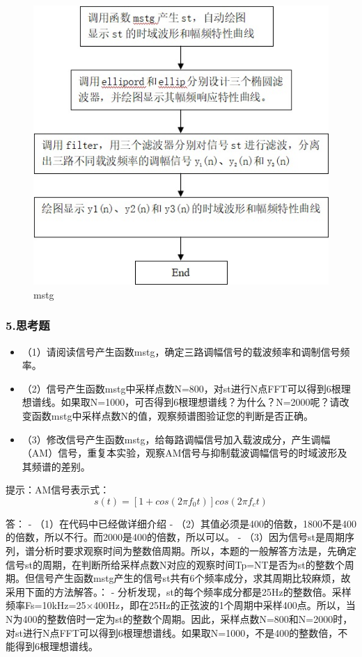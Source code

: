 \documentclass[11pt]{article}
\makeatletter
\def\maxwidth{\ifdim\Gin@nat@width>\linewidth\linewidth
    \else\Gin@nat@width\fi}
\let\Oldincludegraphics\includegraphics
\renewcommand{\includegraphics}[1]{\Oldincludegraphics[width=.8\maxwidth]{#1}}
\providecommand{\tightlist}{%
      \setlength{\itemsep}{0pt}\setlength{\parskip}{0pt}}
\makeatother
\begin{document}
\begin{figure}
\centering
\includegraphics{mstg.jpg}
\caption{mstg}
\end{figure}

    \subsubsection{5.思考题}\label{ux601dux8003ux9898}

\begin{itemize}
\tightlist
\item
  （1）请阅读信号产生函数mstg，确定三路调幅信号的载波频率和调制信号频率。
\item
  （2）信号产生函数mstg中采样点数N=800，对st进行N点FFT可以得到6根理想谱线。如果取N=1000，可否得到6根理想谱线？为什么？N=2000呢？请改变函数mstg中采样点数N的值，观察频谱图验证您的判断是否正确。
\item
  （3）修改信号产生函数mstg，给每路调幅信号加入载波成分，产生调幅（AM）信号，重复本实验，观察AM信号与抑制载波调幅信号的时域波形及其频谱的差别。
\end{itemize}

提示：AM信号表示式：\[s(t)=[1+cos(2\pi f_0 t)]cos(2\pi f_c t)\]

答： - （1）在代码中已经做详细介绍 -
（2）其值必须是400的倍数，1800不是400的倍数，所以不行。而2000是400的倍数，所以可以。
-
（3）因为信号st是周期序列，谱分析时要求观察时间为整数倍周期。所以，本题的一般解答方法是，先确定信号st的周期，在判断所给采样点数N对应的观察时间Tp=NT是否为st的整数个周期。但信号产生函数mstg产生的信号st共有6个频率成分，求其周期比较麻烦，故采用下面的方法解答。：
-
分析发现，st的每个频率成分都是25Hz的整数倍。采样频率Fs=10kHz=25×400Hz，即在25Hz的正弦波的1个周期中采样400点。所以，当N为400的整数倍时一定为st的整数个周期。因此，采样点数N=800和N=2000时，对st进行N点FFT可以得到6根理想谱线。如果取N=1000，不是400的整数倍，不能得到6根理想谱线。
\end{document}
